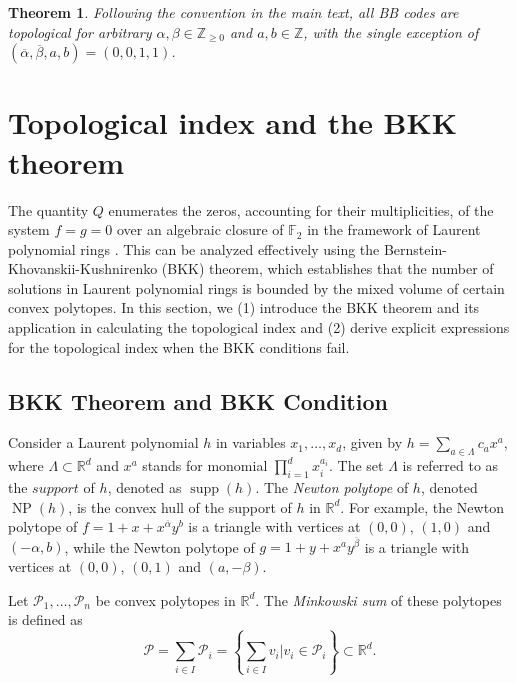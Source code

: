 \documentclass[aps,prl,english,superscriptaddress,twocolumn,tightenlines,showpacs,longbibliography,floatfix,amsfonts]{revtex4-2}
\newtheorem{thm}{Theorem}
\begin{document}
\begin{thm}
	Following the convention in the main text, all BB codes are topological for arbitrary $\alpha,\beta\in\mathbb{Z}_{\geq0}$ and $a,b\in\mathbb{Z}$, with the single exception of $(\overline{\alpha}, \overline{\beta}, a, b) = (0,0,1,1)$.
\end{thm}

\section{Topological index and the BKK theorem}
The quantity $Q$ enumerates the zeros, accounting for their multiplicities, of the system $f=g=0$ over an algebraic closure of $\mathbb{F}_2$ in the framework of Laurent polynomial rings \cite{Haah13}. This can be analyzed effectively using the Bernstein-Khovanskii-Kushnirenko (BKK) theorem, which establishes that the number of solutions in Laurent polynomial rings is bounded by the mixed volume of certain convex polytopes. In this section, we (1) introduce the BKK theorem and its application in calculating the topological index and (2) derive explicit expressions for the topological index when the BKK conditions fail.

\subsection{BKK Theorem and BKK Condition}
Consider a Laurent polynomial $h$ in variables $x_1,\dots,x_d$, given by $h=\sum_{a\in\Lambda}c_a x^a$, where $\Lambda\subset \mathbb{R}^d$ and $x^a$ stands for monomial $\prod_{i=1}^d x_i^{a_i}$. The set $\Lambda$ is referred to as the $\textit{support}$ of $h$, denoted as $\mathop{supp}(h)$. The \textit{Newton polytope} of $h$, denoted $\mathop{NP}(h)$,  is the convex hull of the support of $h$ in $\mathbb{R}^d$. For example, the Newton polytope of $f=1+x+x^{\overline{\alpha}}y^b$ is a triangle with vertices at $(0,0)$, $(1,0)$ and $(-\alpha,b)$, while the Newton polytope of $g=1+y+x^a y^{\overline{\beta}}$ is a triangle with vertices at $(0,0)$, $(0,1)$ and $(a,-\beta)$.

Let $\mathcal{P}_1,\dots,\mathcal{P}_n$ be convex polytopes in $\mathbb{R}^d$. The \textit{Minkowski sum} of these polytopes is defined as
\begin{equation}
	\mathcal{P} = \sum_{i\in I}\mathcal{P}_i = \left\{\sum_{i\in I} v_i \big| v_i \in \mathcal{P}_i\right\} \subset \mathbb{R}^d.
\end{equation}
\end{document}
